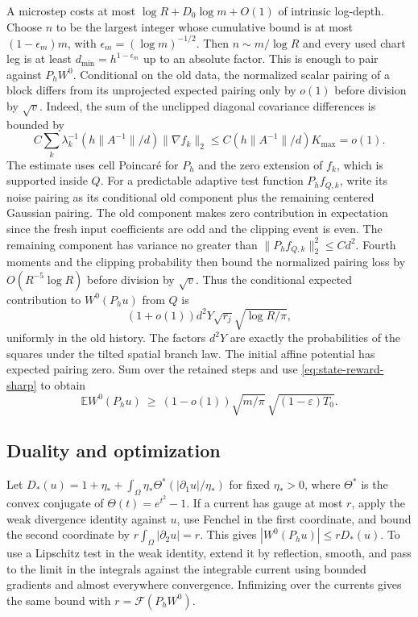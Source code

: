 \documentclass[11pt]{article}
\newcommand{\1}{\mathbf{1}}
\numberwithin{equation}{section}
\newcommand{\E}{\mathbb E}
\begin{document}
A microstep costs at most
\(\log R+D_0\log m+O(1)\) of intrinsic log-depth.
Choose \(n\) to be the largest integer whose cumulative
bound is at most \((1-\epsilon_m)m\), with
\(\epsilon_m=(\log m)^{-1/2}\).
Then \(n\sim m/\log R\) and every used chart leg is at
least \(d_{\min}=h^{1-\epsilon_m}\) up to an absolute
factor. This is enough to pair against \(P_hW^0\).
Conditional on the old data, the normalized scalar
pairing of a block differs from its unprojected expected
pairing only by \(o(1)\) before division by \(\sqrt v\).
Indeed, the sum of the unclipped diagonal covariance
differences is bounded by
\[
 C\sum_k \lambda_k^{-1}(h\|A^{-1}\|/d)\|\nabla f_k\|_2
 \le C(h\|A^{-1}\|/d)K_{\max}=o(1).
\]
The estimate uses cell Poincar\'e for \(P_h\) and the
zero extension of \(f_k\), which is supported inside \(Q\).
For a predictable adaptive test function \(P_h f_{Q,k}\),
write its noise pairing as its conditional old component
plus the remaining centered Gaussian pairing. The old
component makes zero contribution in expectation since
the fresh input coefficients are odd and the clipping event
is even. The remaining component has variance no greater
than \(\|P_h f_{Q,k}\|_2^2\le C d^2\).
Fourth moments and the clipping probability then bound the
normalized pairing loss by \(O(R^{-5}\log R)\) before
division by \(\sqrt v\). Thus the conditional expected
contribution to \(W^0(P_hu)\) from \(Q\) is
\[
 (1+o(1))d^2Y\sqrt{r_j}\sqrt{\log R/\pi},
\]
uniformly in the old history. The factors \(d^2Y\) are
exactly the probabilities of the squares under the tilted
spatial branch law. The initial affine potential has
expected pairing zero. Sum over the retained steps and use
\eqref{eq:state-reward-sharp} to obtain
\[
 \E W^0(P_hu)\ \ge\
 (1-o(1))\sqrt{m/\pi}\,\sqrt{(1-\varepsilon)T_0}.
\]

\subsection{Duality and optimization}

Let \(D_*(u)=1+\eta_*+\int_\Omega
\eta_*\Theta^*(|\partial_1 u|/\eta_*)\) for fixed
\(\eta_*>0\), where \(\Theta^*\) is the convex conjugate of
\(\Theta(t)=e^{t^2}-1\). If a current has gauge at most \(r\),
apply the weak divergence identity against \(u\), use
Fenchel in the first coordinate, and bound the second
coordinate by \(r\int_\Omega|\partial_2u|=r\). This gives
\(|W^0(P_hu)|\le r D_*(u)\). To use a Lipschitz test in the
weak identity, extend it by reflection, smooth, and pass
to the limit in the integrals against the integrable
current using bounded gradients and almost everywhere
convergence. Infimizing over the currents gives the same
bound with \(r=\mathcal F(P_hW^0)\).
\end{document}
